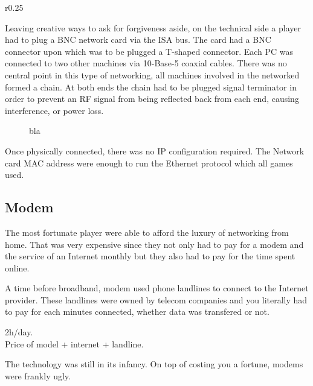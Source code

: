 \begin{wrapfigure}[7]{r}{0.25\textwidth}
\centering
{}
\end{wrapfigure}

Leaving creative ways to ask for forgiveness aside, on the technical side a player had to plug a BNC network card via the ISA bus. The card had a BNC connector upon which was to be plugged a T-shaped connector. Each PC was connected to two other machines via 10-Base-5 coaxial cables. 
There was no central point in this type of networking, all machines involved in the networked formed a chain. At both ends the chain had to be plugged signal terminator in order to prevent an RF signal from being reflected back from each end, causing interference, or power loss.\\
\par
\begin{figure}
\centering
{}
\caption{bla}
\end{figure}

\par
Once physically connected, there was no IP configuration required. The Network card MAC address were enough to run the Ethernet protocol which all games used.\\
\par











\subsection{Modem}
The most fortunate player were able to afford the luxury of networking from home. That was very expensive since they not only had to pay for a modem and the service of an Internet monthly but they also had to pay for the time spent online.\\
\par 
A time before broadband, modem used phone landlines to connect to the Internet provider. These landlines were owned by telecom companies and you literally had to pay for each minutes connected, whether data was transfered or not.\\
\par
2h/day.\\
Price of model + internet + landline. \\
\par
The technology was still in its infancy. On top of costing you a fortune, modems were frankly ugly.\\
\par
{}

